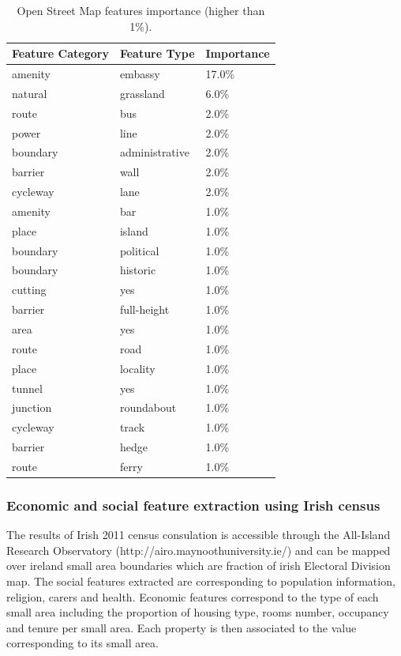 \documentclass[]{elsarticle} %
\begin{document}
\begin{table}[!h]

\caption{\label{tab:OSM-features-table}Open Street Map features importance (higher than 1\%).}
\centering
\fontsize{8}{10}\selectfont
\begin{tabu} to 
\toprule
Feature Category & Feature Type & Importance\\
\midrule
amenity & embassy & 17.0\%\\
natural & grassland & 6.0\%\\
route & bus & 2.0\%\\
power & line & 2.0\%\\
boundary & administrative & 2.0\%\\
barrier & wall & 2.0\%\\
cycleway & lane & 2.0\%\\
amenity & bar & 1.0\%\\
place & island & 1.0\%\\
boundary & political & 1.0\%\\
boundary & historic & 1.0\%\\
cutting & yes & 1.0\%\\
barrier & full-height & 1.0\%\\
area & yes & 1.0\%\\
route & road & 1.0\%\\
place & locality & 1.0\%\\
tunnel & yes & 1.0\%\\
junction & roundabout & 1.0\%\\
cycleway & track & 1.0\%\\
barrier & hedge & 1.0\%\\
route & ferry & 1.0\%\\
\bottomrule
\end{tabu}
\end{table}

\subsubsection{Economic and social feature extraction using Irish
census}\label{economic-and-social-feature-extraction-using-irish-census}

The results of Irish 2011 census consulation is accessible through the
All-Island Research Observatory (http://airo.maynoothuniversity.ie/) and
can be mapped over ireland small area boundaries which are fraction of
irish Electoral Division map. The social features extracted are
corresponding to population information, religion, carers and health.
Economic features correspond to the type of each small area including
the proportion of housing type, rooms number, occupancy and tenure per
small area. Each property is then associated to the value corresponding
to its small area.
\end{document}

